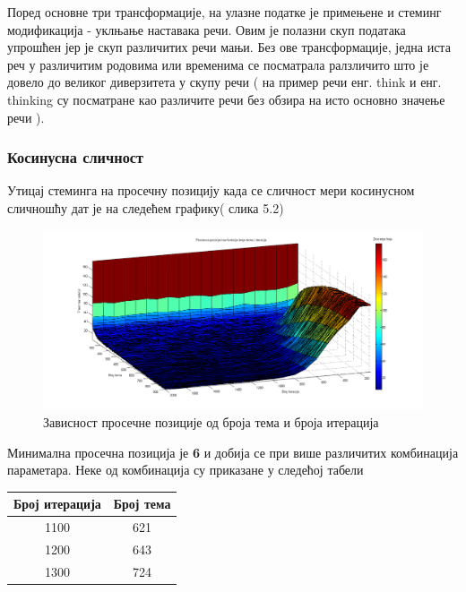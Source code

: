 Поред основне три трансформације, на улазне податке је примењене и стеминг модификација - уклњање наставака речи. Овим је полазни скуп података упрошћен јер је скуп различитих речи мањи. Без ове трансформације, једна иста реч у различитим родовима или временима се посматрала ралзличито што је довело до великог диверзитета у скупу речи ( на пример речи енг. think и енг. thinking су посматране као различите речи без обзира на исто основно значење речи ). 

\subsubsection{Косинусна сличност}



Утицај стеминга на просечну позицију  када се сличност мери косинусном сличношћу дат је на следећем графику( слика 5.2)

		\begin{figure}[H]
    \centering
   \includegraphics[scale=0.3]{./Slike/StemNoSyn.png} 
	\caption{Зависност просечне позиције од броја тема и броја итерација}
	\label{fig:slika1}
\end{figure}

Минимална просечна позиција је \textbf{6} и добија се при више различитих комбинација параметара. Неке од комбинација су приказане у следећој табели

\begin{center}
\begin{tabular}{|c|c|}
\hline
Број итерација & Број тема \\
\hline\hline
1100 & 621 \\
1200 & 643 \\
1300 & 724 \\
\hline
\end{tabular}
\end{center}

